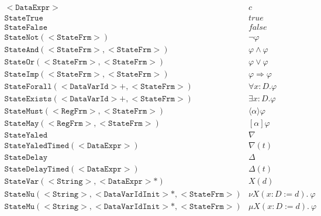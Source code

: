 \[
\begin{array}{ll}
\mathtt{<DataExpr>                                        } & c                              \\
\mathtt{StateTrue                                         } & true                           \\
\mathtt{StateFalse                                        } & false                          \\
\mathtt{StateNot(<StateFrm>)                              } & \neg \varphi                   \\
\mathtt{StateAnd(<StateFrm>, <StateFrm>)                  } & \varphi \wedge \varphi         \\
\mathtt{StateOr(<StateFrm>, <StateFrm>)                   } & \varphi \vee \varphi           \\
\mathtt{StateImp(<StateFrm>, <StateFrm>)                  } & \varphi \Rightarrow \varphi    \\
\mathtt{StateForall(<DataVarId>+, <StateFrm>)             } & \forall x{:}D .\varphi         \\
\mathtt{StateExists(<DataVarId>+, <StateFrm>)             } & \exists x{:}D .\varphi         \\
\mathtt{StateMust(<RegFrm>, <StateFrm>)                   } & \langle\alpha\rangle \varphi   \\
\mathtt{StateMay(<RegFrm>, <StateFrm>)                    } & [\alpha] \varphi               \\
\mathtt{StateYaled                                        } & \nabla                         \\
\mathtt{StateYaledTimed(<DataExpr>)                       } & \nabla(t)                      \\
\mathtt{StateDelay                                        } & \Delta                         \\
\mathtt{StateDelayTimed(<DataExpr>)                       } & \Delta(t)                      \\
\mathtt{StateVar(<String>, <DataExpr>\ast)                } & X(d)                           \\
\mathtt{StateNu(<String>, <DataVarIdInit>\ast, <StateFrm>)} & \nu  X(x{:}D:=d).~\varphi      \\
\mathtt{StateMu(<String>, <DataVarIdInit>\ast, <StateFrm>)} & \mu  X(x{:}D:=d).~\varphi
\end{array}
\]

